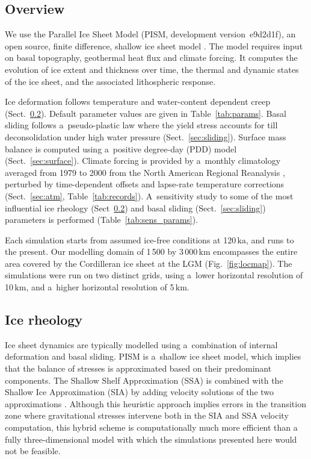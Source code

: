 \documentclass{article}
\newcommand{\unit}[1]{\ensuremath{\mathrm{#1}}}
\begin{document}
\subsection{Overview}
\label{sec:overview}%

    We use the Parallel Ice Sheet
    Model (PISM, development version~e9d2d1f), an open source, finite
    difference, shallow ice sheet model \citep{PISM-authors.2017}. The
    model requires input on basal topography, geothermal heat
    flux and climate forcing. It computes the evolution of ice extent and
    thickness over time, the thermal and dynamic states of the ice sheet,
    and the associated lithospheric response.


      Ice deformation
      follows temperature and water-content dependent creep
      (Sect.~\ref{sec:icedyn}). Default parameter values are given in
      Table~\ref{tab:params}. Basal sliding follows
      a~pseudo-plastic law where the yield stress accounts for till
      deconsolidation under high water pressure (Sect.~\ref{sec:sliding}).
      Surface mass balance is
      computed using a~positive degree-day (PDD) model
      (Sect.~\ref{sec:surface}). Climate forcing is provided by a~monthly
      climatology averaged from 1979 to 2000 from the North American
      Regional Reanalysis \citep[NARR,][]{Mesinger.etal.2006}, perturbed
      by time-dependent offsets and lapse-rate temperature corrections
      (Sect.~\ref{sec:atm}, Table~\ref{tab:records}). A~sensitivity study
      to some of the most influential ice rheology (Sect~\ref{sec:icedyn})
      and basal sliding (Sect.~\ref{sec:sliding}) parameters is performed
      (Table~\ref{tab:sens_params}).

      Each simulation starts from assumed ice-free conditions at
      120\,\unit{ka}, and runs to the present.
      Our modelling domain of 1\,500 by 3\,000\,\unit{km} encompasses
      the entire area covered by the Cordilleran ice sheet at the LGM
      (Fig.~\ref{fig:locmap}). The simulations were run on two distinct
      grids, using a~lower horizontal resolution of 10\,\unit{km}, and
      a~higher horizontal resolution of 5\,\unit{km}.

\subsection{Ice rheology}
\label{sec:icedyn}

      Ice sheet dynamics are typically modelled using a~combination of
      internal deformation and basal sliding. PISM is a~shallow ice sheet
      model, which implies that the balance of stresses is approximated
      based on their predominant components. The Shallow Shelf Approximation
      (SSA) is combined with the Shallow Ice Approximation
      (SIA) by adding velocity solutions of the two approximations
      \citep[Eqs.~7--9 and 15]{Winkelmann.etal.2011}. Although this
      heuristic approach implies errors in the transition zone where gravitational
      stresses intervene both in the SIA and SSA velocity computation, this
      hybrid scheme is computationally much more efficient than a fully
      three-dimensional model with which the simulations presented here
      would not be feasible.
\end{document}
